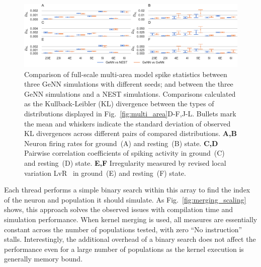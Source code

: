 \documentclass[9pt,a4paper]{amsart}
\newenvironment{fullwidth}{%
  \begin{adjustwidth}{-0.85in}{-0.85in}
}{\end{adjustwidth}}
\begin{document}
\begin{figure}
    \begin{fullwidth}
        \centering
        \includegraphics{figures/microcircuit_accuracy_kl}
        \captionsetup{width=6.69in}
        \caption{Comparison of full-scale multi-area model spike statistics between three GeNN simulations with different seeds; and between the three GeNN simulations and a NEST simulations. Comparisons calculated as the Kullback-Leibler (KL) divergence between the types of distributions displayed in Fig.~\ref{fig:multi_area}D-F,J-L. Bullets mark the mean and whiskers indicate the standard deviation of observed KL divergences across different pairs of compared distributions.
        \textbf{A,B} Neuron firing rates for ground~(A) and resting~(B) state.
        \textbf{C,D} Pairwise correlation coefficients of spiking activity in ground~(C) and resting~(D) state.
        \textbf{E,F} Irregularity measured by revised local variation LvR~\citep{Shinomoto2009} in ground~(E) and resting~(F) state.}
        \label{fig:microcircuit_accuracy_kl}
    \end{fullwidth}
\end{figure}
%
Each thread performs a simple binary search within this array to find the index of the neuron and population it should simulate.
As Fig.~\ref{fig:merging_scaling} shows, this approach solves the observed issues with compilation time and simulation performance. When kernel merging is used, all measures are essentially constant across the number of populations tested, with zero ``No instruction'' stalls. Interestingly, the additional overhead of a binary search does not affect the performance even for a large number of populations as the kernel execution is generally memory bound.
\end{document}
